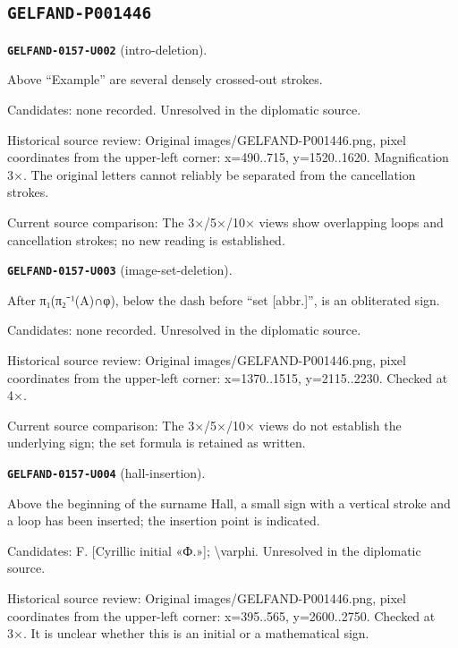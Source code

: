 \subsection*{\texttt{GELFAND-P001446}}
\par\noindent\leavevmode{}\label{GELFAND-0157-U002}\label{GELFAND-P001446:intro-deletion}\textbf{\texttt{GELFAND-0157-U002}} (intro-deletion).\nopagebreak[4]\par
Above “Example” are several densely crossed-out strokes.\par
Candidates: none recorded. Unresolved in the diplomatic source.\par
Historical source review: Original images/GELFAND-P001446.png, pixel coordinates from the upper-left corner: x=490..715, y=1520..1620. Magnification 3×. The original letters cannot reliably be separated from the cancellation strokes.\par
Current source comparison: The 3×/5×/10× views show overlapping loops and cancellation strokes; no new reading is established.\par\medskip
\par\noindent\leavevmode{}\label{GELFAND-0157-U003}\label{GELFAND-P001446:image-set-deletion}\textbf{\texttt{GELFAND-0157-U003}} (image-set-deletion).\nopagebreak[4]\par
After π₁(π₂⁻¹(A)∩φ), below the dash before “set [abbr.]”, is an obliterated sign.\par
Candidates: none recorded. Unresolved in the diplomatic source.\par
Historical source review: Original images/GELFAND-P001446.png, pixel coordinates from the upper-left corner: x=1370..1515, y=2115..2230. Checked at 4×.\par
Current source comparison: The 3×/5×/10× views do not establish the underlying sign; the set formula is retained as written.\par\medskip
\par\noindent\leavevmode{}\label{GELFAND-0157-U004}\label{GELFAND-P001446:hall-insertion}\textbf{\texttt{GELFAND-0157-U004}} (hall-insertion).\nopagebreak[4]\par
Above the beginning of the surname Hall, a small sign with a vertical stroke and a loop has been inserted; the insertion point is indicated.\par
Candidates: F. [Cyrillic initial «Ф.»]; \textbackslash{}varphi. Unresolved in the diplomatic source.\par
Historical source review: Original images/GELFAND-P001446.png, pixel coordinates from the upper-left corner: x=395..565, y=2600..2750. Checked at 3×. It is unclear whether this is an initial or a mathematical sign.\par
